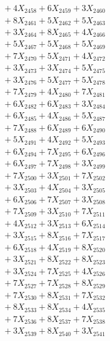 \documentclass[a4paper,10pt]{article}
\begin{document}
{\begin{align}
&\;  + 4 X_{2458} + 6 X_{2459} + 3 X_{2460} \\[0.3ex]
&\;  + 8 X_{2461} + 5 X_{2462} + 5 X_{2463} \\[0.3ex]
&\;  + 3 X_{2464} + 8 X_{2465} + 4 X_{2466} \\[0.3ex]
&\;  + 5 X_{2467} + 5 X_{2468} + 5 X_{2469} \\[0.5ex]\allowbreak
&\;  + 7 X_{2470} + 5 X_{2471} + 4 X_{2472} \\[0.3ex]
&\;  + 3 X_{2473} + 3 X_{2474} + 5 X_{2475} \\[0.3ex]
&\;  + 3 X_{2476} + 5 X_{2477} + 5 X_{2478} \\[0.3ex]
&\;  + 7 X_{2479} + 4 X_{2480} + 7 X_{2481} \\[0.3ex]
&\;  + 6 X_{2482} + 6 X_{2483} + 3 X_{2484} \\[0.3ex]
&\;  + 6 X_{2485} + 4 X_{2486} + 5 X_{2487} \\[0.3ex]
&\;  + 7 X_{2488} + 6 X_{2489} + 6 X_{2490} \\[0.3ex]
&\;  + 5 X_{2491} + 4 X_{2492} + 5 X_{2493} \\[0.3ex]
&\;  + 6 X_{2494} + 7 X_{2495} + 6 X_{2496} \\[0.3ex]
&\;  + 6 X_{2497} + 7 X_{2498} + 3 X_{2499} \\[0.5ex]\allowbreak
&\;  + 7 X_{2500} + 3 X_{2501} + 7 X_{2502} \\[0.3ex]
&\;  + 3 X_{2503} + 4 X_{2504} + 3 X_{2505} \\[0.3ex]
&\;  + 6 X_{2506} + 7 X_{2507} + 3 X_{2508} \\[0.3ex]
&\;  + 7 X_{2509} + 3 X_{2510} + 7 X_{2511} \\[0.3ex]
&\;  + 4 X_{2512} + 3 X_{2513} + 6 X_{2514} \\[0.3ex]
&\;  + 3 X_{2515} + 8 X_{2516} + 7 X_{2517} \\[0.3ex]
&\;  + 6 X_{2518} + 4 X_{2519} + 8 X_{2520} \\[0.3ex]
&\;  + 3 X_{2521} + 8 X_{2522} + 8 X_{2523} \\[0.3ex]
&\;  + 3 X_{2524} + 7 X_{2525} + 4 X_{2526} \\[0.3ex]
&\;  + 7 X_{2527} + 7 X_{2528} + 8 X_{2529} \\[0.5ex]\allowbreak
&\;  + 7 X_{2530} + 8 X_{2531} + 7 X_{2532} \\[0.3ex]
&\;  + 8 X_{2533} + 8 X_{2534} + 4 X_{2535} \\[0.3ex]
&\;  + 7 X_{2536} + 8 X_{2537} + 7 X_{2538} \\[0.3ex]
&\;  + 3 X_{2539} + 8 X_{2540} + 3 X_{2541} \\[0.3ex]

\end{align}}
\end{document}

